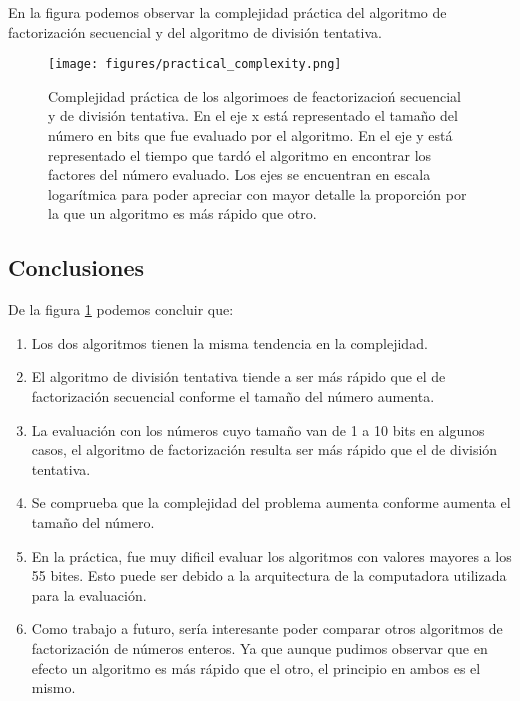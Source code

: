\documentclass{article}
\begin{document}
En la figura podemos observar la complejidad práctica del algoritmo de
factorización secuencial y del algoritmo de división tentativa.

\begin{figure}[H]
        \texttt{[image: figures/practical\_complexity.png]}
\caption{Complejidad práctica de los algorimoes de feactorizacioń secuencial y
de división tentativa. En el eje x está representado el tamaño del número en
bits que fue evaluado por el algoritmo. En el eje y está representado el tiempo
que tardó el algoritmo en encontrar los factores del número evaluado.
Los ejes se encuentran en escala logarítmica para poder apreciar con mayor
detalle la proporción por la que un algoritmo es más rápido que otro.
    } \label{complejidad}
\end{figure}

\subsection{Conclusiones}

De la figura \ref{complejidad} podemos concluir que:

\begin{enumerate}
    \item Los dos algoritmos tienen la misma tendencia en la complejidad.
\item El algoritmo de división tentativa tiende a ser más rápido que el de
factorización secuencial conforme el tamaño del número aumenta.
\item La evaluación con los números cuyo tamaño van de 1 a 10 bits en algunos
casos, el algoritmo de factorización resulta ser más rápido que el de división
tentativa.
\item Se comprueba que la complejidad del problema aumenta conforme aumenta el
tamaño del número.
\item En la práctica, fue muy dificil evaluar los algoritmos con valores mayores
a los 55 bites. Esto puede ser debido a la arquitectura de la computadora
utilizada para la evaluación.
\item Como trabajo a futuro, sería interesante poder comparar otros algoritmos de
factorización de números enteros. Ya que aunque pudimos observar que en efecto
un algoritmo es más rápido que el otro, el principio en ambos es el mismo.

\end{enumerate}

\pagebreak
 

\end{document}
